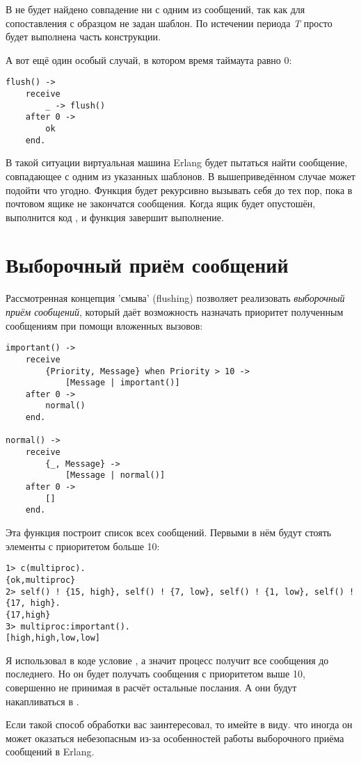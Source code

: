 В  не будет найдено совпадение ни с одним из сообщений, так как для сопоставления с образцом не задан шаблон.
По истечении периода \emph{T} просто будет выполнена  часть конструкции.

А вот ещё один особый случай, в котором время таймаута равно 0:
\begin{lstlisting}[style=erlang]
flush() ->
    receive
        _ -> flush()
    after 0 ->
        ok
    end.
\end{lstlisting}

В такой ситуации виртуальная машина Erlang будет пытаться найти сообщение, совпадающее с одним из указанных шаблонов.
В вышеприведённом случае может подойти что угодно.
Функция  будет рекурсивно вызывать себя до тех пор, пока в почтовом ящике не закончатся сообщения.
Когда ящик будет опустошён, выполнится код , и функция завершит выполнение.
\section{Выборочный приём сообщений}
Рассмотренная  концепция 'смыва' (flushing) позволяет реализовать \emph{выборочный приём сообщений}, который даёт возможность назначать приоритет полученным сообщениям при помощи вложенных вызовов:
\begin{lstlisting}[style=erlang]
important() ->
    receive
        {Priority, Message} when Priority > 10 ->
            [Message | important()]
    after 0 ->
        normal()
    end.
 
normal() ->
    receive
        {_, Message} ->
            [Message | normal()]
    after 0 ->
        []
    end.
\end{lstlisting}

Эта функция построит список всех сообщений.
Первыми в нём будут стоять элементы с приоритетом больше 10:
\begin{lstlisting}[style=erlang]
1> c(multiproc).
{ok,multiproc}
2> self() ! {15, high}, self() ! {7, low}, self() ! {1, low}, self() ! {17, high}.      
{17,high}
3> multiproc:important().
[high,high,low,low]
\end{lstlisting}

Я использовал в коде условие , а значит процесс получит все сообщения до последнего.
Но он будет получать сообщения с приоритетом выше 10, совершенно не принимая в расчёт остальные послания.
А они будут накапливаться в .

Если такой способ обработки вас заинтересовал, то имейте в виду. что иногда он может оказаться небезопасным из\--за особенностей работы выборочного приёма сообщений в Erlang.

